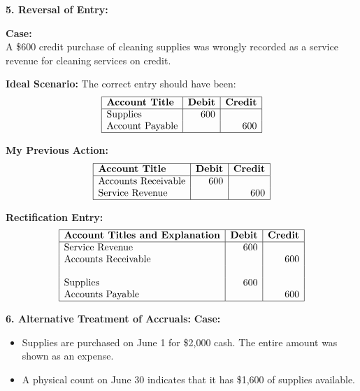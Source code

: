 \documentclass[12pt,a4paper]{book}
\begin{document}
\textbf{5. Reversal of Entry:}
\begin{multicols}{2}
\textbf{Case:} \\
A \$600 credit purchase of cleaning supplies was wrongly recorded
as a service revenue for cleaning services on credit.

\textbf{Ideal Scenario:}
The correct entry should have been:
\[
\begin{array}{|l|r|r|}
\hline
\textbf{Account Title} & \textbf{Debit} & \textbf{Credit} \\
\hline
\text{Supplies} & 600 & \\
\text{Account Payable} & & 600 \\
\hline
\end{array}
\]

\textbf{My Previous Action:}
\[
\begin{array}{|l|r|r|}
\hline
\textbf{Account Title} & \textbf{Debit} & \textbf{Credit} \\
\hline
\text{Accounts Receivable} & 600 & \\
\text{Service Revenue} & & 600 \\
\hline
\end{array}
\]

\textbf{Rectification Entry:}
\[
\begin{array}{|l|r|r|}
\hline
\textbf{Account Titles and Explanation} & \textbf{Debit} & \textbf{Credit} \\
\hline
\text{Service Revenue} & 600 & \\
\text{Accounts Receivable} & & 600 \\
& & \\
\text{Supplies} & 600 & \\
\text{Accounts Payable} & & 600 \\
\hline
\end{array}
\]
\end{multicols}
\vspace{0.5cm}

\textbf{6. Alternative Treatment of Accruals:}
\textbf{Case:}
\begin{itemize}
    \item Supplies are purchased on June 1 for \$2,000 cash. The entire amount was shown as an expense.
    \item A physical count on June 30 indicates that it has \$1,600 of supplies available.
\end{itemize}
\end{document}
